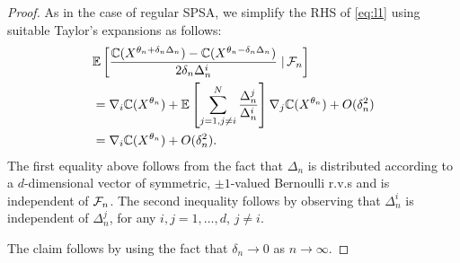 \begin{proof}

As in the case of regular SPSA, we simplify the RHS of \eqref{eq:l1} using suitable Taylor's expansions as follows:
\begin{align}
&\mathbb{E}\left[\dfrac{\mathbb{C}(X^{\theta_n + \delta_n \Delta_n}) - \mathbb{C}(X^{\theta_n - \delta_n \Delta_n})}{2 \delta_n \Delta_n^i} \left.\right| \mathcal{F}_n\right] \nonumber\\
&= \nabla_i \mathbb{C}(X^{\theta_n}) + \mathbb{E}\left[\sum_{j=1,j\not=i}^{N} \frac{\Delta_n^j}{\Delta_n^i}\right]\nabla_j \mathbb{C}(X^{\theta_n}) + O(\delta_n^2)\nonumber\\
&=  \nabla_i \mathbb{C}(X^{\theta_n}) + O(\delta_n^2).\label{eq:l2}
\end{align}
The first equality above follows from the fact that $\Delta_n$ is distributed according to a $d$-dimensional vector of symmetric, $\pm 1$-valued Bernoulli r.v.s and is independent of $\mathcal{F}_n$. The second inequality follows by observing that $\Delta_n^i$ is independent of $\Delta_n^j$, for any $i,j =1,\ldots,d$, $j\ne i$. 

The claim follows by using the fact that $\delta_n \rightarrow 0$ as $n\rightarrow \infty$.
\end{proof}

